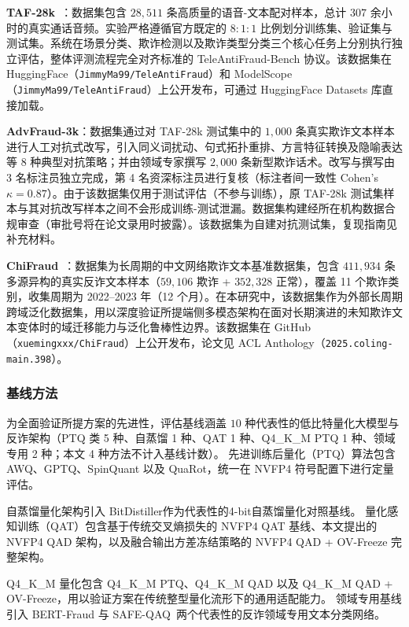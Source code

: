 \documentclass[11pt, a4paper]{article}
\begin{document}
\textbf{TAF-28k}~\cite{1}：数据集包含 $28,511$ 条高质量的语音-文本配对样本，总计 $307$ 余小时的真实通话音频。实验严格遵循官方既定的 $8:1:1$ 比例划分训练集、验证集与测试集。系统在场景分类、欺诈检测以及欺诈类型分类三个核心任务上分别执行独立评估，整体评测流程完全对齐标准的 TeleAntiFraud-Bench 协议。该数据集在 HuggingFace（\texttt{JimmyMa99/TeleAntiFraud}）和 ModelScope（\texttt{JimmyMa99/TeleAntiFraud}）上公开发布，可通过 HuggingFace Datasets 库直接加载。
   
\textbf{AdvFraud-3k}：数据集通过对 TAF-28k 测试集中的 $1{,}000$ 条真实欺诈文本样本进行人工对抗式改写，引入同义词扰动、句式拓扑重排、方言特征转换及隐喻表达等 $8$ 种典型对抗策略；并由领域专家撰写 $2{,}000$ 条新型欺诈话术。改写与撰写由 3 名标注员独立完成，第 4 名资深标注员进行复核（标注者间一致性 Cohen's $\kappa = 0.87$）。由于该数据集仅用于测试评估（不参与训练），原 TAF-28k 测试集样本与其对抗改写样本之间不会形成训练-测试泄漏。数据集构建经所在机构数据合规审查（审批号将在论文录用时披露）。该数据集为自建对抗测试集，复现指南见补充材料。
   
\textbf{ChiFraud}~\cite{chifraud}：数据集为长周期的中文网络欺诈文本基准数据集，包含 $411{,}934$ 条多源异构的真实反诈文本样本（$59{,}106$ 欺诈 + $352{,}328$ 正常），覆盖 11 个欺诈类别，收集周期为 2022--2023 年（12 个月）。在本研究中，该数据集作为外部长周期跨域泛化数据集，用以深度验证所提端侧多模态架构在面对长期演进的未知欺诈文本变体时的域迁移能力与泛化鲁棒性边界。该数据集在 GitHub（\texttt{xuemingxxx/ChiFraud}）上公开发布，论文见 ACL Anthology（\texttt{2025.coling-main.398}）。

\subsubsection{基线方法}

为全面验证所提方案的先进性，评估基线涵盖 $10$ 种代表性的低比特量化大模型与反诈架构（PTQ 类 5 种、自蒸馏 1 种、QAT 1 种、Q4\_K\_M PTQ 1 种、领域专用 2 种；本文 4 种方法不计入基线计数）。
先进训练后量化（PTQ）算法包含 AWQ、GPTQ、SpinQuant 以及 QuaRot，统一在 NVFP4 符号配置下进行定量评估。

自蒸馏量化架构引入 BitDistiller作为代表性的4-bit自蒸馏量化对照基线。
量化感知训练（QAT）包含基于传统交叉熵损失的 NVFP4 QAT 基线、本文提出的 NVFP4 QAD 架构，以及融合输出方差冻结策略的 NVFP4 QAD + OV-Freeze 完整架构。 

Q4\_K\_M 量化包含 Q4\_K\_M PTQ、Q4\_K\_M QAD 以及 Q4\_K\_M QAD + OV-Freeze，用以验证方案在传统整型量化流形下的通用适配能力。 
领域专用基线引入 BERT-Fraud 与 SAFE-QAQ~两个代表性的反诈领域专用文本分类网络。
\end{document}
